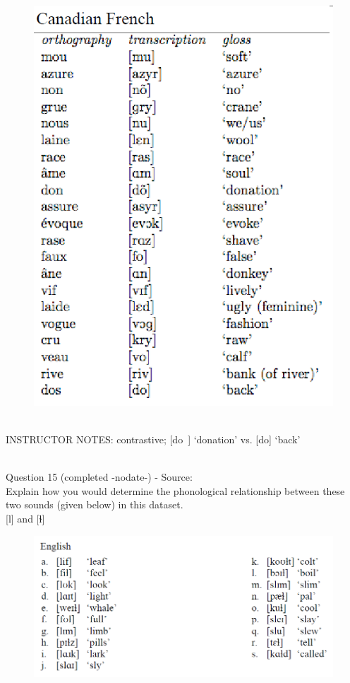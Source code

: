 \documentclass[12pt]{article}
\begin{document}
\begin{figure}[H]
\includegraphics{../images/canadianfrench.png}
\end{figure}

~\\
INSTRUCTOR NOTES: contrastive; [do~] ‘donation’ vs. [do] ‘back’


~\\

{\large Question 15} (completed -nodate-) - Source: \\

Explain how you would determine the phonological relationship between these two sounds (given below) in this dataset.\\

{[l]} and {[ɫ]}

\begin{figure}[H]
\includegraphics{../images/english_laterals.png}
\end{figure}
\end{document}
